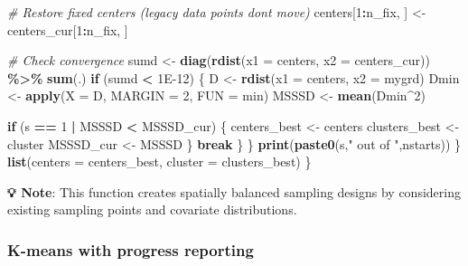 \documentclass[
  10pt,
  b5paper,
  oneside]{book}
\newenvironment{Shaded}{\begin{snugshade}}{\end{snugshade}}
\newcommand{\AttributeTok}[1]{\textcolor[rgb]{0.13,0.29,0.53}{#1}}
\newcommand{\CommentTok}[1]{\textcolor[rgb]{0.56,0.35,0.01}{\textit{#1}}}
\newcommand{\ControlFlowTok}[1]{\textcolor[rgb]{0.13,0.29,0.53}{\textbf{#1}}}
\newcommand{\DecValTok}[1]{\textcolor[rgb]{0.00,0.00,0.81}{#1}}
\newcommand{\FloatTok}[1]{\textcolor[rgb]{0.00,0.00,0.81}{#1}}
\newcommand{\FunctionTok}[1]{\textcolor[rgb]{0.13,0.29,0.53}{\textbf{#1}}}
\newcommand{\NormalTok}[1]{#1}
\newcommand{\OtherTok}[1]{\textcolor[rgb]{0.56,0.35,0.01}{#1}}
\newcommand{\SpecialCharTok}[1]{\textcolor[rgb]{0.81,0.36,0.00}{\textbf{#1}}}
\newcommand{\StringTok}[1]{\textcolor[rgb]{0.31,0.60,0.02}{#1}}
\begin{document}
\begin{Shaded}
\begin{Highlighting}[]
      \CommentTok{\# Restore fixed centers (legacy data points don\textquotesingle{}t move)}
\NormalTok{      centers[}\DecValTok{1}\SpecialCharTok{:}\NormalTok{n\_fix, ] }\OtherTok{\textless{}{-}}\NormalTok{ centers\_cur[}\DecValTok{1}\SpecialCharTok{:}\NormalTok{n\_fix, ]}
      
      \CommentTok{\# Check convergence}
\NormalTok{      sumd }\OtherTok{\textless{}{-}} \FunctionTok{diag}\NormalTok{(}\FunctionTok{rdist}\NormalTok{(}\AttributeTok{x1 =}\NormalTok{ centers, }\AttributeTok{x2 =}\NormalTok{ centers\_cur)) }\SpecialCharTok{\%\textgreater{}\%} \FunctionTok{sum}\NormalTok{(.)}
      \ControlFlowTok{if}\NormalTok{ (sumd }\SpecialCharTok{\textless{}} \FloatTok{1E{-}12}\NormalTok{) \{}
\NormalTok{        D }\OtherTok{\textless{}{-}} \FunctionTok{rdist}\NormalTok{(}\AttributeTok{x1 =}\NormalTok{ centers, }\AttributeTok{x2 =}\NormalTok{ mygrd)}
\NormalTok{        Dmin }\OtherTok{\textless{}{-}} \FunctionTok{apply}\NormalTok{(}\AttributeTok{X =}\NormalTok{ D, }\AttributeTok{MARGIN =} \DecValTok{2}\NormalTok{, }\AttributeTok{FUN =}\NormalTok{ min)}
\NormalTok{        MSSSD }\OtherTok{\textless{}{-}} \FunctionTok{mean}\NormalTok{(Dmin}\SpecialCharTok{\^{}}\DecValTok{2}\NormalTok{)}
        
        \ControlFlowTok{if}\NormalTok{ (s }\SpecialCharTok{==} \DecValTok{1} \SpecialCharTok{|}\NormalTok{ MSSSD }\SpecialCharTok{\textless{}}\NormalTok{ MSSSD\_cur) \{}
\NormalTok{          centers\_best }\OtherTok{\textless{}{-}}\NormalTok{ centers}
\NormalTok{          clusters\_best }\OtherTok{\textless{}{-}}\NormalTok{ cluster}
\NormalTok{          MSSSD\_cur }\OtherTok{\textless{}{-}}\NormalTok{ MSSSD}
\NormalTok{        \}}
        \ControlFlowTok{break}
\NormalTok{      \}}
\NormalTok{    \}}
    \FunctionTok{print}\NormalTok{(}\FunctionTok{paste0}\NormalTok{(s,}\StringTok{" out of "}\NormalTok{,nstarts))}
\NormalTok{  \}}
  \FunctionTok{list}\NormalTok{(}\AttributeTok{centers =}\NormalTok{ centers\_best, }\AttributeTok{cluster =}\NormalTok{ clusters\_best)}
\NormalTok{\}}
\end{Highlighting}
\end{Shaded}

\textbf{💡 Note}: This function creates spatially balanced sampling designs by considering existing sampling points and covariate distributions.

\subsubsection{K-means with progress reporting}\label{k-means-with-progress-reporting}
\end{document}
